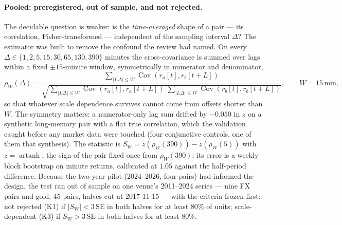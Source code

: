\documentclass[11pt,a4paper]{article}
\numberwithin{equation}{section}
\begin{document}
\paragraph{Pooled: preregistered, out of sample, and not rejected.}
The decidable question is weaker: is the \emph{time-averaged}
shape of a pair --- its correlation, Fisher-transformed ---
independent of the sampling interval $\Delta$? The estimator was
built to remove the confound the review had named. On every
$\Delta\in\{1,2,5,15,30,65,130,390\}$ minutes the
cross-covariance is summed over lags within a fixed $\pm15$-minute
window, symmetrically in numerator and denominator,
\begin{equation}
\rho_W(\Delta)=
\frac{\sum_{|L\Delta|\le W}\operatorname{Cov}(r_a[t],r_b[t+L])}
{\sqrt{\sum_{|L\Delta|\le W}\operatorname{Cov}(r_a[t],r_a[t+L])
\;\sum_{|L\Delta|\le W}\operatorname{Cov}(r_b[t],r_b[t+L])}},
\qquad W=15\,\mathrm{min},
\label{eq:lagsum}
\end{equation}
so that whatever scale dependence survives cannot come from
offsets shorter than $W$. The symmetry matters: a numerator-only
lag sum drifted by $-0.050$ in $z$ on a synthetic long-memory pair
with a flat true correlation, which the validation caught before
any market data were touched (four conjunctive controls, one of
them that synthesis). The statistic is
$S_W=z(\rho_W(390))-z(\rho_W(5))$ with $z=\operatorname{artanh}$,
the sign of the pair fixed once from $\rho_W(390)$; its error is a
weekly block bootstrap on minute returns, calibrated at $1.05$
against the half-period difference. Because the two-year pilot
(2024--2026, four pairs) had informed the design, the test ran out
of sample on one venue's 2011--2024 series --- nine FX pairs and
gold, 45 pairs, halves cut at 2017-11-15 --- with the criteria
frozen first: not rejected (K1) if $|S_W|<3\,\mathrm{SE}$ in both
halves for at least $80\%$ of units; scale-dependent (K3) if
$S_W>3\,\mathrm{SE}$ in both halves for at least $80\%$.
\end{document}

